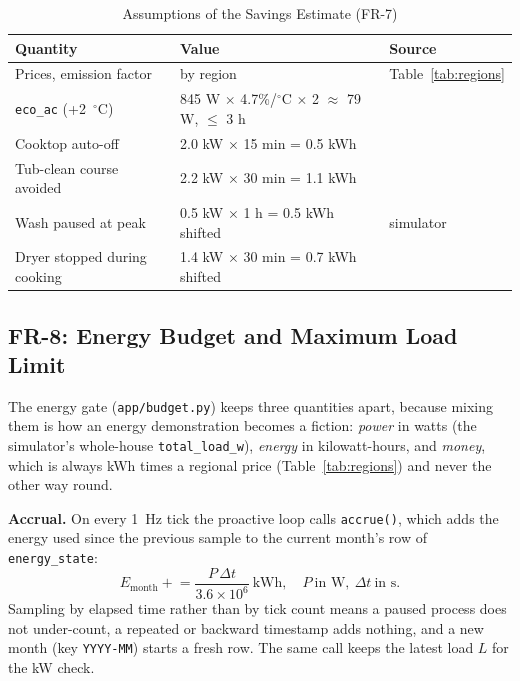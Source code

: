 \documentclass[conference]{IEEEtran}
\begin{document}
\begin{table}[!t]
\caption{Assumptions of the Savings Estimate (FR-7)}
\label{tab:savings}
\centering
\footnotesize
\begin{tabular}{p{3.5cm}p{1.9cm}p{1.5cm}}
\toprule
\textbf{Quantity} & \textbf{Value} & \textbf{Source} \\
\midrule
Prices, emission factor & by region & Table~\ref{tab:regions} \\
\texttt{eco\_ac} (+2~$^\circ$C) & 845 W $\times$ 4.7\%/$^\circ$C $\times$ 2 $\approx$ 79 W, $\leq$ 3 h & \cite{lgac2024,kea2017} \\
Cooktop auto-off & 2.0 kW $\times$ 15 min = 0.5 kWh & \cite{lgcook2026} \\
Tub-clean course avoided & 2.2 kW $\times$ 30 min = 1.1 kWh & \cite{lgwash2026} \\
Wash paused at peak & 0.5 kW $\times$ 1 h = 0.5 kWh shifted & simulator \\
Dryer stopped during cooking & 1.4 kW $\times$ 30 min = 0.7 kWh shifted & \cite{lgdry2026} \\
\bottomrule
\end{tabular}
\end{table}

\subsection{FR-8: Energy Budget and Maximum Load Limit}
\label{sec:fr8}
The energy gate (\texttt{app/budget.py}) keeps three quantities apart, because mixing them is how an energy demonstration becomes a fiction: \emph{power} in watts (the simulator's whole-house \texttt{total\_load\_w}), \emph{energy} in kilowatt-hours, and \emph{money}, which is always kWh times a regional price (Table~\ref{tab:regions}) and never the other way round.

\textbf{Accrual.} On every 1~Hz tick the proactive loop calls \texttt{accrue()}, which adds the energy used since the previous sample to the current month's row of \texttt{energy\_state}:
\begin{equation}
E_{\text{month}} \mathrel{+}= \frac{P\,\Delta t}{3.6\times10^{6}}\ \text{kWh}, \quad P\ \text{in W},\ \Delta t\ \text{in s}.
\end{equation}
Sampling by elapsed time rather than by tick count means a paused process does not under-count, a repeated or backward timestamp adds nothing, and a new month (key \texttt{YYYY-MM}) starts a fresh row. The same call keeps the latest load $L$ for the kW check.
\end{document}
